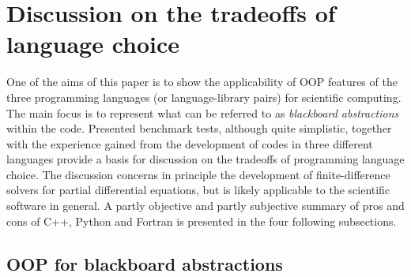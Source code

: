 \documentclass[final,5p,times,twocolumn]{elsarticle}
\begin{document}
  \section{Discussion on the tradeoffs of language choice}

  One of the aims of this paper is to show the applicability of OOP features of the three
    programming languages (or language-library pairs) for scientific computing.
  The main focus is to represent
    what can be referred to as {\em blackboard abstractions} \citep{Rouson_et_al_2012} within the code.
  Presented benchmark tests, although quite simplistic, together with the experience gained 
    from the development of codes in three different
    languages provide a basis for discussion on the tradeoffs of programming language choice.
  The discussion concerns in principle the development of finite-difference solvers for 
    partial differential equations, but is likely applicable to the scientific software in general.
  A partly objective and partly subjective summary of pros and cons of C++, Python and Fortran
    is presented in the four following subsections.

  \subsection{OOP for blackboard abstractions}
\end{document}
